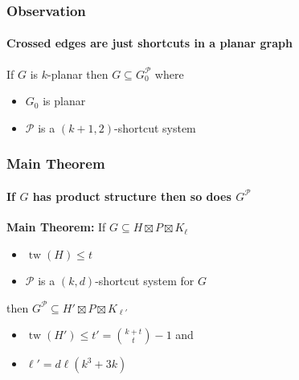 \documentclass[xcolor=dvipsnames]{beamer}
\DeclareMathOperator{\tw}{tw}
\begin{document}
\begin{frame}
    \frametitle{Observation}
    \framesubtitle{Crossed edges are just shortcuts in a planar graph}

    If $G$ is $k$-planar then $G\subseteq G_0^{\mathcal{P}}$ where
    \begin{itemize}
        \item<2-> $G_0$ is planar
        \item<3-> $\mathcal{P}$ is a $(k+1,2)$-shortcut system
    \end{itemize}
    \begin{center}
    \end{center}
\end{frame}

\begin{frame}
  \frametitle{Main Theorem}
  \framesubtitle{If $G$ has product structure then so does $G^{\mathcal{P}}$}
  \textbf{Main Theorem:} \newline
  If $G\subseteq H\boxtimes P\boxtimes K_\ell$
  \begin{itemize}
    \item  $\tw(H)\le t$
    \item $\mathcal{P}$ is a $(k,d)$-shortcut system for $G$
  \end{itemize}
  then $G^\mathcal{P}\subseteq H'\boxtimes P\boxtimes K_{\ell'}$
  \begin{itemize}
    \item $\tw(H') \le t'=\binom{k+t}{t}-1$ and
    \item $\ell'=d\ell(k^3+3k)$
  \end{itemize}
  \vspace{1cm}
\end{frame}
\end{document}
